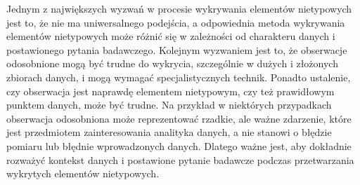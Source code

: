 \documentclass[12pt,a4paper,oneside]{book}
\theoremstyle{definition}
\begin{document}
Jednym z największych wyzwań w procesie wykrywania elementów nietypowych jest to, że nie ma uniwersalnego podejścia, a odpowiednia metoda wykrywania elementów nietypowych może różnić się w zależności od charakteru danych i postawionego pytania badawczego. Kolejnym wyzwaniem jest to, że obserwacje odosobnione mogą być trudne do wykrycia, szczególnie w dużych i złożonych zbiorach danych, i mogą wymagać specjalistycznych technik. Ponadto ustalenie, czy obserwacja jest naprawdę elementem nietypowym, czy też prawidłowym punktem danych, może być trudne. Na przykład w niektórych przypadkach obserwacja odosobniona może reprezentować rzadkie, ale ważne zdarzenie, które jest przedmiotem zainteresowania analityka danych, a nie stanowi o błędzie pomiaru lub błędnie wprowadzonych danych. Dlatego ważne jest, aby dokładnie rozważyć kontekst danych i postawione pytanie badawcze podczas przetwarzania wykrytych elementów nietypowych.
\end{document}
